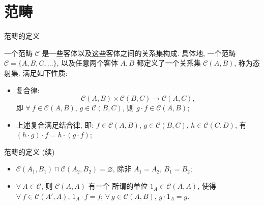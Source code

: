 \section[范畴]{范畴}


\begin{frame}{范畴的定义}

\begin{Def}[范畴]
一个范畴 $\mathcal{C}$ 是一些客体以及这些客体之间的关系集构成.
具体地, 一个范畴 $\mathcal{C} = \{ A, B, C, \dots \}$, 以及任意两个客体
$A, B$ 都定义了一个关系集 $\mathcal{C}(A, B)$, 称为态射集.
满足如下性质:
\begin{itemize}
\item[$1^{\circ}$] 复合律:
  \[
  \mathcal{C}(A, B) \times \mathcal{C}(B, C) \longrightarrow \mathcal{C}(A, C),
  \]
  即 $\forall\ f \in \mathcal{C}(A, B)$, $g \in \mathcal{C}(B, C)$,
  则 $g \cdot f \in \mathcal{C}(A, B)$;
\item[$2^{\circ}$] 上述复合满足结合律, 即:
  $f \in \mathcal{C}(A, B)$, $g \in \mathcal{C}(B, C)$, $h \in \mathcal{C}(C, D)$, 有
  $(h \cdot g) \cdot f = h \cdot (g \cdot f)$;
\end{itemize}
\end{Def}

\end{frame}


\begin{frame}{范畴的定义 (续)}

\begin{Def}[范畴, 续]
\begin{itemize}
\item[$3^{\circ}$] $\mathcal{C}(A_1, B_1) \cap \mathcal{C}(A_2, B_2) = \varnothing$,
  除非 $A_1 = A_2$, $B_1 = B_2$;
\item[$4^{\circ}$] $\forall\ A \in \mathcal{C}$, 则 $\mathcal{C}(A, A)$ 有一个
  所谓的单位 $1_A \in \mathcal{C}(A, A)$, 使得
  $\forall\ f \in \mathcal{C}(A', A)$, $1_A \cdot f = f$;
  $\forall\ g \in \mathcal{C}(A, B)$, $g \cdot 1_A = g$.
\end{itemize}
\end{Def}

\end{frame}


